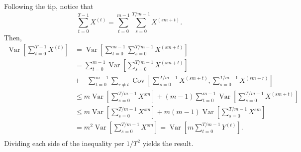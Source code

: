 \documentclass[a4paper,12pt]{article}
\newcommand{\var}{\operatorname{Var}}
\theoremstyle{definition}
\begin{document}
\begin{enumerate}
    Following the tip, notice that 
    $$
    \sum_{t=0}^{T-1} X^{(t)} = \sum_{t=0}^{m-1} \sum_{s=0}^{T/m-1} X^{(sm + t)}.
    $$
    Then,
    \begin{equation*}
        \begin{split}
            \var\left[\sum_{t=0}^{T-1} X^{(t)}\right] &= \var\left[\sum_{t=0}^{m-1} \sum_{s=0}^{T/m-1} X^{(sm + t)}\right] \\
            &= \sum_{t =0}^{m-1} \var\left[\sum_{s=0}^{T/m-1} X^{(sm + t)}\right] \\
            &+\quad \sum_{t=0}^{m-1}\sum_{r\neq t} \operatorname{Cov}\left[\sum_{s=0}^{T/m-1} X^{(sm + t)}, \sum_{s=0}^{T/m-1} X^{(sm + r)}\right] \\
            &\le m\var\left[\sum_{s=0}^{T/m-1} X^{sm}\right] + (m-1)\sum_{t=0}^{m-1} \var\left[\sum_{s=0}^{T/m-1} X^{(sm + t)}\right] \\
            &\le m\var\left[\sum_{s=0}^{T/m-1} X^{sm}\right] + m(m-1)\var\left[\sum_{s=0}^{T/m-1} X^{sm}\right] \\ 
            &= m^2\var\left[\sum_{s=0}^{T/m-1} X^{sm}\right] =  \var\left[m\sum_{t=0}^{T/m-1} Y^{(t)}\right]. \\
        \end{split}
    \end{equation*}
    Dividing each side of the inequality per $1/T^2$ yields the result. 
\end{enumerate}
\end{document}
